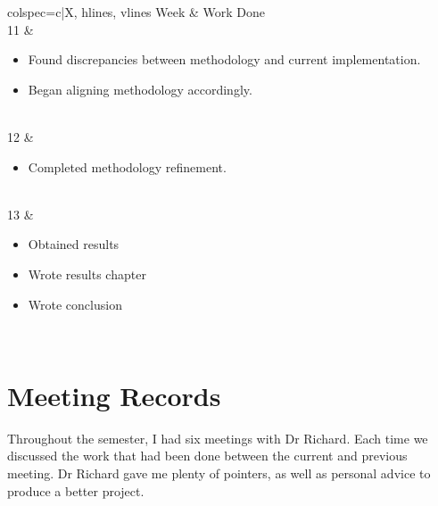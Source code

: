 \documentclass[a4paper, 12pt]{extreport}
\begin{document}
			\begin{longtblr}[
				caption = Weekly breakdown of work done for the final report.
				]{colspec={c|X}, hlines, vlines}
				Week & Work Done \\
				11 & \begin{varwidth}[t]{\linewidth}
					\begin{itemize}[topsep=0pt,parsep=0pt]
						\item Found discrepancies between methodology and current implementation.
						\item Began aligning methodology accordingly.
					\end{itemize}
				\end{varwidth}\\
				12 & \begin{varwidth}[t]{\linewidth}
					\begin{itemize}[topsep=0pt,parsep=0pt]
						\item Completed methodology refinement.
					\end{itemize}
				\end{varwidth}\\
				13 & \begin{varwidth}[t]{\linewidth}
					\begin{itemize}[topsep=0pt,parsep=0pt]
						\item Obtained results
						\item Wrote results chapter
						\item Wrote conclusion
					\end{itemize}
				\end{varwidth}\\
			\end{longtblr}
	
	\chapter{Meeting Records}
	
	Throughout the semester, I had six meetings with Dr Richard. Each time we discussed the work that had been done between the current and previous meeting. Dr Richard gave me plenty of pointers, as well as personal advice to produce a better project.
	
\end{document}
